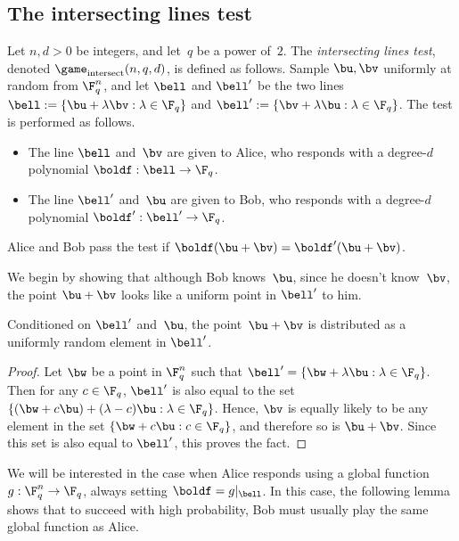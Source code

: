 \subsection{The intersecting lines test}\label{sec:intersecting-lines}

\begin{definition}
Let $n, d > 0$ be integers, and let~$q$ be a power of~$2$.
The \emph{intersecting lines test}, denoted $\game_{\mathrm{intersect}}(n, q, d)$, is defined as follows.
Sample $\bu, \bv$ uniformly at random from $\F_q^n$,
and let $\bell$ and $\bell'$ be the two lines
$\bell := \{\bu + \lambda \bv : \lambda \in \F_q\}$
and $\bell' := \{\bv + \lambda \bu : \lambda \in \F_q\}$.
The test is performed as follows.
\begin{itemize}
\itemsep -.5pt
\item[$\circ$] The line $\bell$ and~$\bv$ are given to Alice, who responds with a degree-$d$ polynomial $\boldf: \bell \rightarrow \F_q$.
\item[$\circ$] The line $\bell'$ and~$\bu$ are given to Bob, who responds with a degree-$d$ polynomial $\boldf':\bell' \rightarrow  \F_q$.
\end{itemize}
Alice and Bob pass the test if $\boldf(\bu + \bv) = \boldf'(\bu + \bv)$.
\end{definition}

We begin by showing that although Bob knows~$\bu$, since he doesn't know~$\bv$,
the point $\bu + \bv$ looks like a uniform point in $\bell'$ to him.

\begin{fact}\label{fact:easy-peasy-lemon-peasy}
Conditioned on $\bell'$ and~$\bu$, the point~$\bu+\bv$ is distributed as a uniformly random element in $\bell'$.
\end{fact}
\begin{proof}
Let $\bw$ be a point in $\F_q^n$ such that $\bell' = \{\bw + \lambda \bu : \lambda \in \F_q\}$. 
Then for any $c \in \F_q$, $\bell'$ is also equal to the set
$\{(\bw + c\bu) + (\lambda-c) \bu : \lambda \in \F_q\}$.
Hence, $\bv$ is equally likely to be any element in the set $\{\bw + c \bu : c \in \F_q\}$,
and therefore so is $\bu + \bv$.
Since this set is also equal to $\bell'$, this proves the fact.
\end{proof}

We will be interested in the case when Alice responds using a global function~$g:\F_q^n \rightarrow \F_q$,
always setting $\boldf = g|_{\bell}$.
In this case, the following lemma shows that to succeed with high probability,
Bob must usually play the same global function as Alice.

